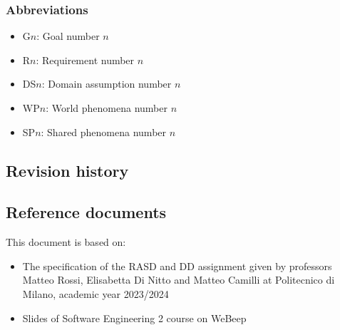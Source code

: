 \subsubsection{Abbreviations}
\begin{itemize}
    \item G$n$: Goal number $n$
    \item R$n$: Requirement number $n$
    \item DS$n$: Domain assumption number $n$
    \item WP$n$: World phenomena number $n$
    \item SP$n$: Shared phenomena number $n$
\end{itemize}

\subsection{Revision history}

\subsection{Reference documents}
This document is based on:
\begin{itemize}
    \item The specification of the RASD and DD assignment given by professors Matteo Rossi, Elisabetta Di Nitto and Matteo Camilli at Politecnico di Milano, academic year 2023/2024
    \item Slides of Software Engineering 2 course on WeBeep
\end{itemize}

